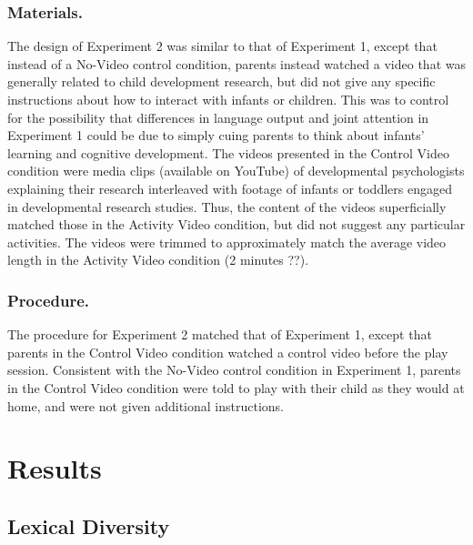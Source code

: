 \documentclass[10pt, letterpaper]{article}
\begin{document}
\subsubsection{Materials.}\label{materials.-1}

The design of Experiment 2 was similar to that of Experiment 1, except
that instead of a No-Video control condition, parents instead watched a
video that was generally related to child development research, but did
not give any specific instructions about how to interact with infants or
children. This was to control for the possibility that differences in
language output and joint attention in Experiment 1 could be due to
simply cuing parents to think about infants' learning and cognitive
development. The videos presented in the Control Video condition were
media clips (available on YouTube) of developmental psychologists
explaining their research interleaved with footage of infants or
toddlers engaged in developmental research studies. Thus, the content of
the videos superficially matched those in the Activity Video condition,
but did not suggest any particular activities. The videos were trimmed
to approximately match the average video length in the Activity Video
condition (2 minutes ??).

\subsubsection{Procedure.}\label{procedure.-1}

The procedure for Experiment 2 matched that of Experiment 1, except that
parents in the Control Video condition watched a control video before
the play session. Consistent with the No-Video control condition in
Experiment 1, parents in the Control Video condition were told to play
with their child as they would at home, and were not given additional
instructions.

\section{Results}\label{results-1}

\subsection{Lexical Diversity}\label{lexical-diversity-1}
\end{document}
